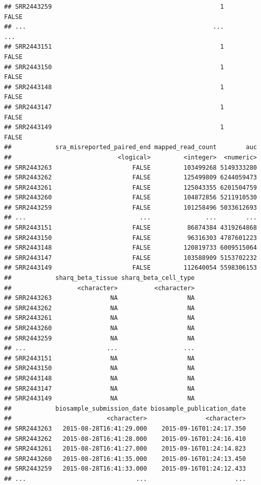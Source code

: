 \documentclass[9pt,a4paper,]{extarticle}
\begin{document}
\begin{verbatim}
## SRR2443259                                              1      FALSE
## ...                                                   ...        ...
## SRR2443151                                              1      FALSE
## SRR2443150                                              1      FALSE
## SRR2443148                                              1      FALSE
## SRR2443147                                              1      FALSE
## SRR2443149                                              1      FALSE
##            sra_misreported_paired_end mapped_read_count        auc
##                             <logical>         <integer>  <numeric>
## SRR2443263                      FALSE         103499268 5149333280
## SRR2443262                      FALSE         125499809 6244059473
## SRR2443261                      FALSE         125043355 6201504759
## SRR2443260                      FALSE         104872856 5211910530
## SRR2443259                      FALSE         101258496 5033612693
## ...                               ...               ...        ...
## SRR2443151                      FALSE          86874384 4319264868
## SRR2443150                      FALSE          96316303 4787601223
## SRR2443148                      FALSE         120819733 6009515064
## SRR2443147                      FALSE         103588909 5153702232
## SRR2443149                      FALSE         112640054 5598306153
##            sharq_beta_tissue sharq_beta_cell_type
##                  <character>          <character>
## SRR2443263                NA                   NA
## SRR2443262                NA                   NA
## SRR2443261                NA                   NA
## SRR2443260                NA                   NA
## SRR2443259                NA                   NA
## ...                      ...                  ...
## SRR2443151                NA                   NA
## SRR2443150                NA                   NA
## SRR2443148                NA                   NA
## SRR2443147                NA                   NA
## SRR2443149                NA                   NA
##            biosample_submission_date biosample_publication_date
##                          <character>                <character>
## SRR2443263   2015-08-28T16:41:29.000    2015-09-16T01:24:17.350
## SRR2443262   2015-08-28T16:41:28.000    2015-09-16T01:24:16.410
## SRR2443261   2015-08-28T16:41:27.000    2015-09-16T01:24:14.823
## SRR2443260   2015-08-28T16:41:35.000    2015-09-16T01:24:13.450
## SRR2443259   2015-08-28T16:41:33.000    2015-09-16T01:24:12.433
## ...                              ...                        ...

\end{verbatim}
\end{document}
